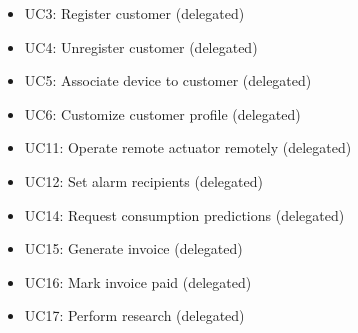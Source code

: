 \begin{itemize}
\begin{itemize}
	  	\item UC3: Register customer (delegated)
	  	\item UC4: Unregister customer (delegated)
	  	\item UC5: Associate device to customer (delegated)
	  	\item UC6: Customize customer profile (delegated)
	  	\item UC11: Operate remote actuator remotely (delegated)
	  	\item UC12: Set alarm recipients (delegated)
	  	\item UC14: Request consumption predictions (delegated)
	  	\item UC15: Generate invoice (delegated)
	  	\item UC16: Mark invoice paid (delegated)
	  	\item UC17: Perform research (delegated)
	\end{itemize}
\end{itemize}
